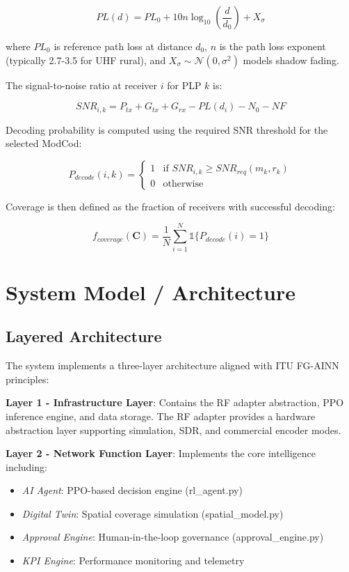 \documentclass[conference]{IEEEtran}
\begin{document}
\begin{equation}
PL(d) = PL_0 + 10n\log_{10}\left(\frac{d}{d_0}\right) + X_\sigma
\end{equation}

where $PL_0$ is reference path loss at distance $d_0$, $n$ is the path loss exponent (typically 2.7-3.5 for UHF rural), and $X_\sigma \sim \mathcal{N}(0, \sigma^2)$ models shadow fading.

The signal-to-noise ratio at receiver $i$ for PLP $k$ is:

\begin{equation}
SNR_{i,k} = P_{tx} + G_{tx} + G_{rx} - PL(d_i) - N_0 - NF
\end{equation}

Decoding probability is computed using the required SNR threshold for the selected ModCod:

\begin{equation}
P_{decode}(i,k) = \begin{cases} 1 & \text{if } SNR_{i,k} \geq SNR_{req}(m_k, r_k) \\ 0 & \text{otherwise} \end{cases}
\end{equation}

Coverage is then defined as the fraction of receivers with successful decoding:

\begin{equation}
f_{coverage}(\mathbf{C}) = \frac{1}{N}\sum_{i=1}^{N} \mathbb{1}\{P_{decode}(i) = 1\}
\end{equation}

\section{System Model / Architecture}

\subsection{Layered Architecture}

The system implements a three-layer architecture aligned with ITU FG-AINN principles:

\textbf{Layer 1 - Infrastructure Layer}: Contains the RF adapter abstraction, PPO inference engine, and data storage. The RF adapter provides a hardware abstraction layer supporting simulation, SDR, and commercial encoder modes.

\textbf{Layer 2 - Network Function Layer}: Implements the core intelligence including:
\begin{itemize}
\item \textit{AI Agent}: PPO-based decision engine (rl\_agent.py)
\item \textit{Digital Twin}: Spatial coverage simulation (spatial\_model.py)
\item \textit{Approval Engine}: Human-in-the-loop governance (approval\_engine.py)
\item \textit{KPI Engine}: Performance monitoring and telemetry
\end{itemize}
\end{document}

